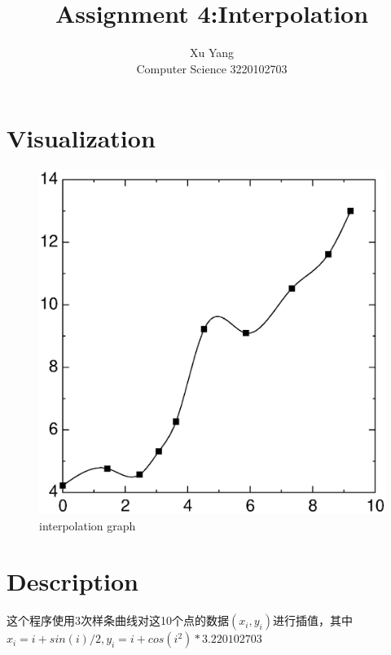 \documentclass[nofonts]{ctexart} %
\title{Assignment 4:Interpolation}
\author{Xu Yang\\ Computer Science 3220102703}
\begin{document}
\maketitle
\section{Visualization}
\begin{figure}[htbp]
      \centering
      \includegraphics[scale=0.5]{./interp.eps}
      \caption{interpolation graph}
  \end{figure}
\section{Description}
这个程序使用3次样条曲线对这10个点的数据$(x_i,y_i)$进行插值，其中$x_i=i+sin(i)/2,y_i=i+cos(i^2)*3.220102703$
\end{document}
